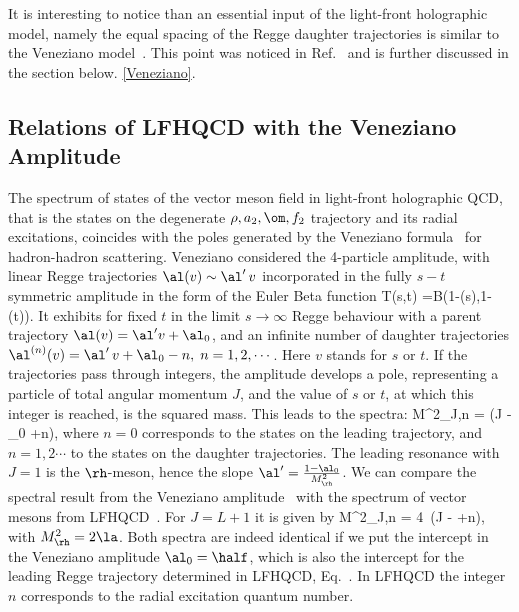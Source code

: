 \documentclass[aps,prd,preprint,groupedaddress]{revtex4-1}
\begin{document}
It is interesting to notice than an essential input of the light-front holographic model, namely the equal spacing of the Regge daughter trajectories is similar to the Veneziano model~\cite{Veneziano:1968yb}. This point was noticed in Ref.~\cite{Brodsky:2014yha} and is further discussed in the section below. \ref{Veneziano}.


\subsection{Relations of LFHQCD with the Veneziano Amplitude }

The spectrum of states of the vector meson field in light-front holographic QCD, that is the states on the degenerate $\rho, a_2,\om, f_2$ trajectory and its radial excitations,  coincides with the poles generated by the Veneziano formula~\cite{Veneziano:1968yb} for hadron-hadron scattering. Veneziano considered the 4-particle amplitude, with linear Regge trajectories $\al(v) \sim  \al'  \,v $  incorporated in the fully  $s-t$ symmetric amplitude in the form of the Euler Beta function
\beq {}
T(s,t) =B(1-\al(s),1-\al(t)).
\enq
It exhibits  for fixed $t$ in the limit $s \to \infty$ Regge behaviour with a parent trajectory $\al(v) = \al' v +\al_{0}$, and an infinite number of daughter trajectories $\al^{(n)}(v) = \al' \, v +\al_{0} - n, \; n=1,2, \cdots$. Here $v$ stands for $s$ or $t$. If the trajectories pass through integers, the amplitude   develops  a pole, representing a particle of total angular momentum $J$,  and the value of $s$ or $t$, at which this integer is reached, is the squared mass. This leads to the spectra:
\beq {}
M^2_{J,n} =  (J - \al_{0} +n),
\enq
where $n=0$ corresponds to the states on the leading trajectory, and $n=1,2 \cdots$ to the states on the daughter trajectories. The leading resonance with $J=1$ is the $\rh$-meson, hence the slope $ \al'=\frac{1-\al_0}{ M_\rh^2}$.  We can compare the spectral result from the Veneziano amplitude~  with the spectrum of vector mesons from LFHQCD~. For  $J=L+1$ it is given by
\beq
M^2_{J,n} = 4\la\,  \left(J - \half +n\right),
\enq
with $M_\rh^2 = 2 \la$. Both spectra are indeed identical if we put the intercept in the Veneziano amplitude $\al_0=\half$, which is also the  intercept for the leading Regge trajectory determined in LFHQCD, Eq.~. In LFHQCD the integer $n$  corresponds to the radial excitation quantum number.
\end{document}
